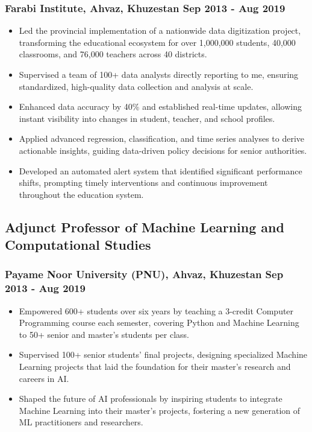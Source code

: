 \documentclass[11pt]{article}
\begin{document}
\subsubsection{Farabi Institute, Ahvaz, Khuzestan \hfill Sep 2013 - Aug 2019}
\begin{itemize}[itemsep=5pt]
	\item Led the provincial implementation of a nationwide data digitization project, transforming the educational ecosystem for over 1,000,000 students, 40,000 classrooms, and 76,000 teachers across 40 districts.
	\item Supervised a team of 100+ data analysts directly reporting to me, ensuring standardized, high-quality data collection and analysis at scale. 
	\item Enhanced data accuracy by 40\% and established real-time updates, allowing instant visibility into changes in student, teacher, and school profiles.
	\item Applied advanced regression, classification, and time series analyses to derive actionable insights, guiding data-driven policy decisions for senior authorities.
	\item Developed an automated alert system that identified significant performance shifts, prompting timely interventions and continuous improvement throughout the education system.
\end{itemize}

\subsection{Adjunct Professor of Machine Learning and Computational Studies}
\subsubsection{Payame Noor University (PNU), Ahvaz, Khuzestan \hfill Sep 2013 - Aug 2019}
\begin{itemize}[itemsep=5pt]
	\item Empowered 600+ students over six years by teaching a 3-credit Computer Programming course each semester, covering Python and Machine Learning to 50+ senior and master's students per class.
	\item Supervised 100+ senior students' final projects, designing specialized Machine Learning projects that laid the foundation for their master's research and careers in AI.
	\item Shaped the future of AI professionals by inspiring students to integrate Machine Learning into their master's projects, fostering a new generation of ML practitioners and researchers.
\end{itemize}
\end{document}

